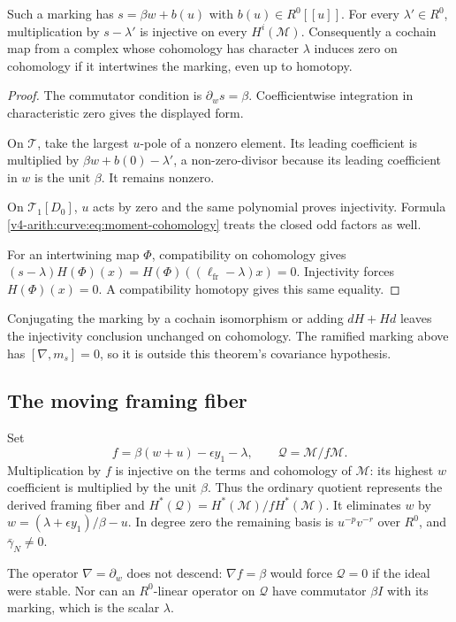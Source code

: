 \begin{theorem}\label{v4-arith:curve:thm:marking-obstruction}
Such a marking has $s=\beta w+b(u)$ with
$b(u)\in R^0[[u]]$.
For every $\lambda'\in R^0$, multiplication by
$s-\lambda'$ is injective on every $H^i(\mathcal M)$.
Consequently a cochain map from a complex whose
cohomology has character $\lambda$ induces zero on
cohomology if it intertwines the marking, even up to
homotopy.
\end{theorem}
\begin{proof}
The commutator condition is $\partial_ws=\beta$.
Coefficientwise integration in characteristic zero gives
the displayed form.

On $\mathcal T$, take the largest
$u$-pole of a nonzero element. Its leading coefficient
is multiplied by $\beta w+b(0)-\lambda'$, a
non-zero-divisor because its leading coefficient in $w$
is the unit $\beta$. It remains nonzero.

On $\mathcal T_1[D_0]$, $u$ acts by zero and the same
polynomial proves injectivity. Formula
\eqref{v4-arith:curve:eq:moment-cohomology} treats the
closed odd factors as well.

For an intertwining map $\Phi$, compatibility on
cohomology gives
$(s-\lambda)H(\Phi)(x)=H(\Phi)((\ell_{\mathrm{fr}}-\lambda)x)=0$.
Injectivity forces $H(\Phi)(x)=0$.
A compatibility homotopy gives this same equality.
\end{proof}

Conjugating the marking by a cochain isomorphism or
adding $dH+Hd$ leaves the injectivity conclusion unchanged
on cohomology. The ramified marking above has
$[\nabla,m_s]=0$, so it is outside this theorem's
covariance hypothesis.

\subsection{The moving framing fiber}

Set
\[
 f=\beta(w+u)-\epsilon y_1-\lambda,\qquad
 \mathcal Q=\mathcal M/f\mathcal M.
\]
Multiplication by $f$ is injective on the terms and
cohomology of $\mathcal M$: its highest $w$ coefficient
is multiplied by the unit $\beta$.
Thus the ordinary quotient represents the derived
framing fiber and
$H^*(\mathcal Q)=H^*(\mathcal M)/fH^*(\mathcal M)$.
It eliminates $w$ by
$w=(\lambda+\epsilon y_1)/\beta-u$.
In degree zero the remaining basis is
$u^{-p}v^{-r}$ over $R^0$, and $\bar\gamma_N\ne0$.

The operator $\nabla=\partial_w$ does not descend:
$\nabla f=\beta$ would force $\mathcal Q=0$ if the
ideal were stable. Nor can an $R^0$-linear operator on
$\mathcal Q$ have commutator $\beta I$ with its marking,
which is the scalar $\lambda$.

